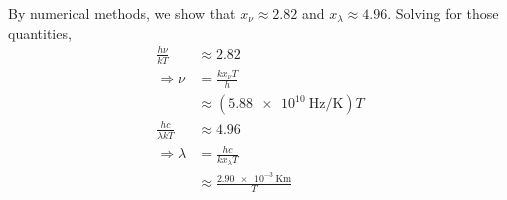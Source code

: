 \documentclass{article}
\begin{document}
By numerical methods, we show that \(x_\nu \approx \num{2.82}\) and \(x_\lambda \approx \num{4.96}\).
Solving for those quantities,
\begin{align}
    \frac{h \nu}{k T} &\approx \num{2.82} \\
    \Rightarrow \nu &= \frac{k x_\nu T}{h} \\
    &\approx (\SI{5.88e+10}{\hertz\per\kelvin})T \\
    \frac{h c}{\lambda k T} &\approx \num{4.96} \\
    \Rightarrow \lambda &= \frac{h c}{k x_\lambda T} \\
    &\approx \frac{\SI{2.90e-3}{\kelvin\meter}}{T}
\end{align}
\end{document}
